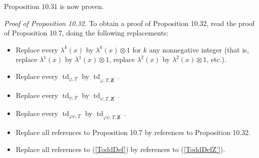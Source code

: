 \documentclass[numbers=enddot,12pt,final,onecolumn,notitlepage]{scrartcl}%
\begin{document}
Proposition 10.31 is now proven.

\textit{Proof of Proposition 10.32.} To obtain a proof of Proposition 10.32,
read the proof of Proposition 10.7, doing the following replacements:

\begin{itemize}
\item Replace every $\lambda^{k}\left(  x\right)  $ by $\lambda^{k}\left(
x\right)  \otimes1$ for $k$ any nonnegative integer (that is, replace
$\lambda^{1}\left(  x\right)  $ by $\lambda^{1}\left(  x\right)  \otimes1$,
replace $\lambda^{2}\left(  x\right)  $ by $\lambda^{2}\left(  x\right)
\otimes1$, etc.).

\item Replace every $\operatorname*{td}\nolimits_{\varphi,T}$ by
$\operatorname*{td}\nolimits_{\varphi,T,\mathbf{Z}^{\prime}}$.

\item Replace every $\operatorname*{td}\nolimits_{\psi,T}$ by
$\operatorname*{td}\nolimits_{\psi,T,\mathbf{Z}^{\prime}}$.

\item Replace every $\operatorname*{td}\nolimits_{\varphi\psi,T}$ by
$\operatorname*{td}\nolimits_{\varphi\psi,T,\mathbf{Z}^{\prime}}$.

\item Replace all references to Proposition 10.7 by references to Proposition 10.32.

\item Replace all references to (\ref{ToddDef}) by references to
(\ref{ToddDefZ'}).
\end{itemize}
\end{document}

